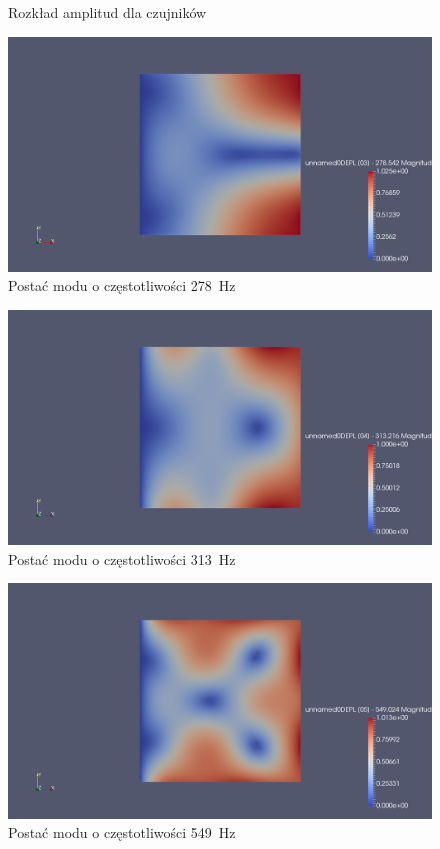 \documentclass[polish,a4paper,11pt]{mwart}
\begin{document}
\begin{figure}[!tbh]
  
  \caption{Rozkład amplitud dla czujników}
  \label{fig:mody}
\end{figure}

\begin{figure}[!tbh]
  \centering
  \includegraphics[width=\textwidth]{./plate_vib/278Hz.png}
  \caption{Postać modu o częstotliwości \SI{278}{\hertz}}
  \label{fig:mod1}
\end{figure}

\begin{figure}[!tbh]
  \centering
  \includegraphics[width=\textwidth]{./plate_vib/313Hz.png}
  \caption{Postać modu o częstotliwości \SI{313}{\hertz}}
  \label{fig:mod2}
\end{figure}

\begin{figure}[!tbh]
  \centering
  \includegraphics[width=\textwidth]{./plate_vib/549Hz.png}
  \caption{Postać modu o częstotliwości \SI{549}{\hertz}}
  \label{fig:mod3}
\end{figure}
\end{document}
